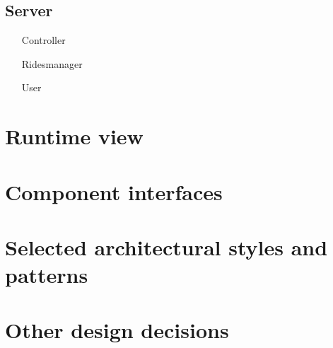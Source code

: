 	\subsection{Server}
	\begin{itemize}
	 \item [Controller]
	 \item [Ridesmanager]
	 \item [User]
	\end{itemize}
\section{Runtime view}

\section{Component interfaces}

\section{Selected architectural styles and patterns}

\section{Other design decisions}
